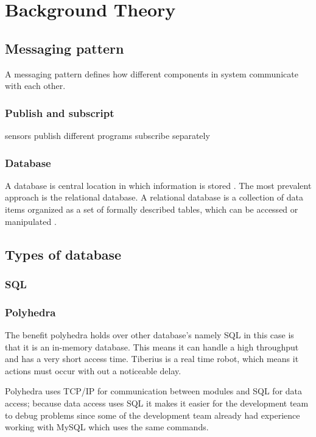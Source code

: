 \section{Background Theory}

\subsection{Messaging pattern}
A messaging pattern defines how different components in system communicate with each other.

\subsubsection{Publish and subscript}
sensors publish
different programs subscribe separately

\subsubsection{Database}
A database is central location in which information is stored \cite{databasedefinition}. The most prevalent approach is the relational database. A relational database is a collection of data items organized as a set of formally described tables, which can be accessed or manipulated \cite{relationaldatabasedefinition}.

\subsection{Types of database}

\subsubsection{SQL}

\subsubsection{Polyhedra}
The benefit polyhedra holds over other database's namely SQL in this case is that it is an in-memory database. This means it can handle a high throughput and has a very short access time. Tiberius is a real time robot, which means it actions must occur with out a noticeable delay. 

Polyhedra uses TCP/IP for communication between modules and SQL for data access; because data access uses SQL it makes it easier for the development team to debug problems since some of the development team already had experience working with MySQL which uses the same commands. 

